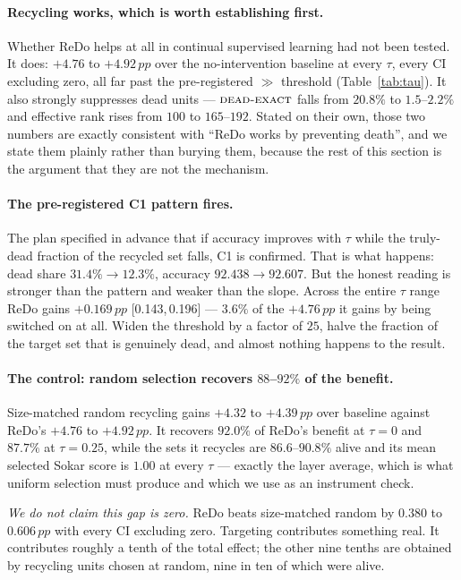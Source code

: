 \documentclass[10pt]{article}
\newcommand{\dexact}{\textsc{dead-exact}}
\newcommand{\pp}{\,pp}
\newcommand{\ci}[2]{{\footnotesize[#1,\,#2]}}
\begin{document}
\paragraph{Recycling works, which is worth establishing first.}
Whether ReDo helps at all in continual supervised learning had not been tested.
It does: $+4.76$ to $+4.92\pp$ over the no-intervention baseline at every $\tau$,
every CI excluding zero, all far past the pre-registered $\gg$ threshold
(Table~\ref{tab:tau}). It also strongly suppresses dead units --- $\dexact$
falls from $20.8\%$ to $1.5$--$2.2\%$ and effective rank rises from $100$ to
$165$--$192$. Stated on their own, those two numbers are exactly consistent with
``ReDo works by preventing death'', and we state them plainly rather than
burying them, because the rest of this section is the argument that they are
not the mechanism.

\paragraph{The pre-registered C1 pattern fires.}
The plan specified in advance that if accuracy improves with $\tau$ while the
truly-dead fraction of the recycled set falls, C1 is confirmed. That is what
happens: dead share $31.4\% \to 12.3\%$, accuracy $92.438 \to 92.607$. But the
honest reading is stronger than the pattern and weaker than the slope. Across
the entire $\tau$ range ReDo gains $+0.169\pp$ \ci{0.143}{0.196} --- $3.6\%$ of
the $+4.76\pp$ it gains by being switched on at all. Widen the threshold by a
factor of $25$, halve the fraction of the target set that is genuinely dead, and
almost nothing happens to the result.

\paragraph{The control: random selection recovers $88$--$92\%$ of the benefit.}
Size-matched random recycling gains $+4.32$ to $+4.39\pp$ over baseline against
ReDo's $+4.76$ to $+4.92\pp$. It recovers $92.0\%$ of ReDo's benefit at $\tau=0$
and $87.7\%$ at $\tau=0.25$, while the sets it recycles are $86.6$--$90.8\%$
alive and its mean selected Sokar score is $1.00$ at every $\tau$ --- exactly the
layer average, which is what uniform selection must produce and which we use as
an instrument check.

\emph{We do not claim this gap is zero.} ReDo beats size-matched random by
$0.380$ to $0.606\pp$ with every CI excluding zero. Targeting contributes
something real. It contributes roughly a tenth of the total effect; the other
nine tenths are obtained by recycling units chosen at random, nine in ten of
which were alive.
\end{document}
